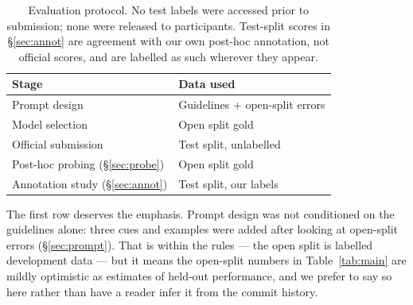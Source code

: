 \begin{table}[t]
\centering
\small
\begin{tabular}{ll}
\toprule
Stage & Data used \\
\midrule
Prompt design       & Guidelines + open-split errors \\
Model selection     & Open split gold \\
Official submission & Test split, unlabelled \\
Post-hoc probing (\S\ref{sec:probe}) & Open split gold \\
Annotation study (\S\ref{sec:annot}) & Test split, our labels \\
\bottomrule
\end{tabular}
\caption{Evaluation protocol. No test labels were accessed prior to
submission; none were released to participants. Test-split scores in
\S\ref{sec:annot} are agreement with our own post-hoc annotation, not
official scores, and are labelled as such wherever they appear.}
\label{tab:protocol}
\end{table}

The first row deserves the emphasis. Prompt design was not conditioned
on the guidelines alone: three cues and examples were added after
looking at open-split errors (\S\ref{sec:prompt}). That is within the
rules --- the open split is labelled development data --- but it means
the open-split numbers in Table~\ref{tab:main} are mildly optimistic as
estimates of held-out performance, and we prefer to say so here rather
than have a reader infer it from the commit history.

